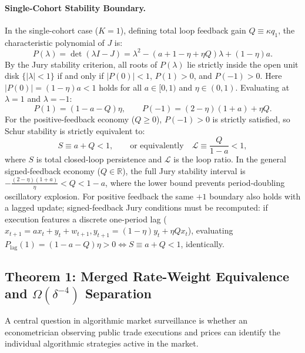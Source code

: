 \documentclass[12pt]{article}
\theoremstyle{definition}
\theoremstyle{remark}
\newcommand{\R}{\mathbb{R}}
\begin{document}
\paragraph{Single-Cohort Stability Boundary.}
In the single-cohort case ($K=1$), defining total loop feedback gain $Q \equiv \kappa q_1$, the characteristic polynomial of $J$ is:
\begin{equation}
P(\lambda) = \det(\lambda I - J) = \lambda^2 - \left( a + 1 - \eta + \eta Q \right) \lambda + (1 - \eta) a.
\label{eq:char_poly}
\end{equation}
By the Jury stability criterion, all roots of $P(\lambda)$ lie strictly inside the open unit disk $\{|\lambda| < 1\}$ if and only if $|P(0)| < 1$, $P(1) > 0$, and $P(-1) > 0$. Here $|P(0)| = (1 - \eta)a < 1$ holds for all $a \in [0, 1)$ and $\eta \in (0, 1)$. Evaluating at $\lambda = 1$ and $\lambda = -1$:
\begin{equation}
P(1) = (1 - a - Q) \eta, \qquad P(-1) = (2 - \eta)(1 + a) + \eta Q.
\end{equation}
For the positive-feedback economy ($Q \ge 0$), $P(-1) > 0$ is strictly satisfied, so Schur stability is strictly equivalent to:
\begin{equation}
S \equiv a + Q < 1, \qquad \text{or equivalently} \quad \mathcal{L} \equiv \frac{Q}{1 - a} < 1,
\label{eq:stability_cond}
\end{equation}
where $S$ is total closed-loop persistence and $\mathcal{L}$ is the loop ratio. In the general signed-feedback economy ($Q \in \R$), the full Jury stability interval is $-\frac{(2-\eta)(1+a)}{\eta} < Q < 1 - a$, where the lower bound prevents period-doubling oscillatory explosion. For positive feedback the same $+1$ boundary also holds with a lagged update; signed-feedback Jury conditions must be recomputed: if execution features a discrete one-period lag ($x_{t+1} = a x_t + y_t + w_{t+1}, y_{t+1} = (1 - \eta) y_t + \eta Q x_t$), evaluating $P_{\text{lag}}(1) = (1 - a - Q)\eta > 0 \iff S \equiv a + Q < 1$, identically.

\subsection{Theorem 1: Merged Rate-Weight Equivalence and \texorpdfstring{$\Omega(\delta^{-4})$}{Omega(delta\textasciicircum(-4))} Separation}
A central question in algorithmic market surveillance is whether an econometrician observing public trade executions and prices can identify the individual algorithmic strategies active in the market.
\end{document}
